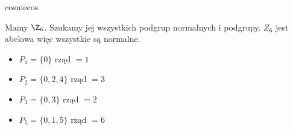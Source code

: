 \begin{problem}[7]
	
	cosniecos
\end{problem} 
\begin{solution}

Mamy $\Z_{6}$.
Szukamy jej wszystkich podgrup normalnych i podgrupy.
$Z_{6}$ jest abelowa więc wszystkie są normalne.

 \begin{itemize}
	\item $P_{1} = \{0\} \text{ rząd } = 1$ 
	\item $P_2 = \{0, 2, 4\} \text{ rząd }= 3$ 
	\item $P_{3} = \{0, 3\} \text{ rząd }= 2$ 
	\item $P_5 = \{0, 1, 5\} \text{ rząd }= 6$
\end{itemize}


	

\end{solution}





